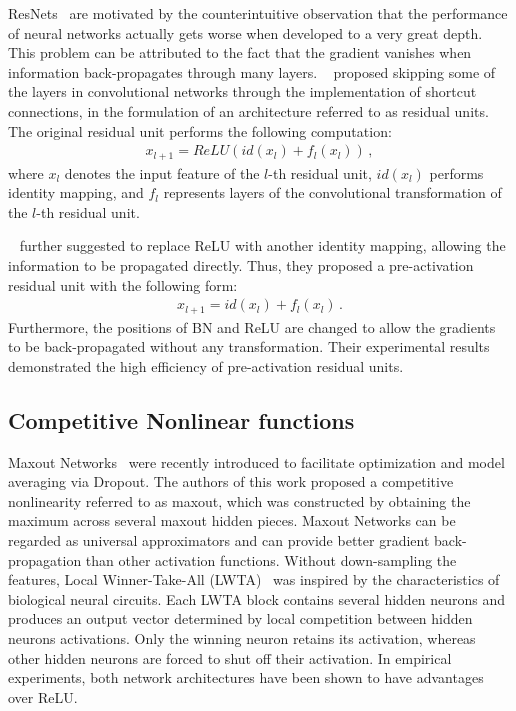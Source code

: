 \documentclass[wcp]{jmlr}
\begin{document}
ResNets~\citep{he2015deep} are motivated by the counterintuitive observation that the performance of neural networks actually gets worse when developed to a very great depth. 
This problem can be attributed to the fact that the gradient vanishes when information back-propagates through many layers. 
~\cite{he2015deep} proposed skipping some of the layers in convolutional networks through the implementation of shortcut connections, in the formulation of an architecture referred to as residual units. The original residual unit performs the following computation:
\begin{align*} x_{l+1}=ReLU(id(x_l )+f_l (x_l )) \, , \end{align*}
where $x_l$ denotes the input feature of the $l$-th residual unit, $id(x_l)$ performs identity mapping, and $f_l$ represents layers of the convolutional transformation of the $l$-th residual unit.

~\cite{he2016identity} further suggested to replace ReLU with another identity mapping, allowing the information to be propagated directly. 
Thus, they proposed a pre-activation residual unit with the following form:
\begin{align*}x_{l+1}=id(x_l )+f_l (x_l ) \, . \end{align*}
Furthermore, the positions of BN and ReLU are changed to allow the gradients to be back-propagated without any transformation.
Their experimental results demonstrated the high efficiency of pre-activation residual units.

\subsection{Competitive Nonlinear functions}
Maxout Networks~\citep{goodfellow2013maxout} were recently introduced to facilitate optimization and model averaging via Dropout. The authors of this work proposed a competitive nonlinearity referred to as maxout, which was constructed by obtaining the maximum across several maxout hidden pieces. Maxout Networks can be regarded as universal approximators and can provide better gradient back-propagation than other activation functions.
Without down-sampling the features, Local Winner-Take-All (LWTA)~\citep{srivastava2013compete} was inspired by the characteristics of biological neural circuits. 
Each LWTA block contains several hidden neurons and produces an output vector determined by local competition between hidden neurons activations.
Only the winning neuron retains its activation, whereas other hidden neurons are forced to shut off their activation.
In empirical experiments, both network architectures have been shown to have advantages over ReLU.
\end{document}
